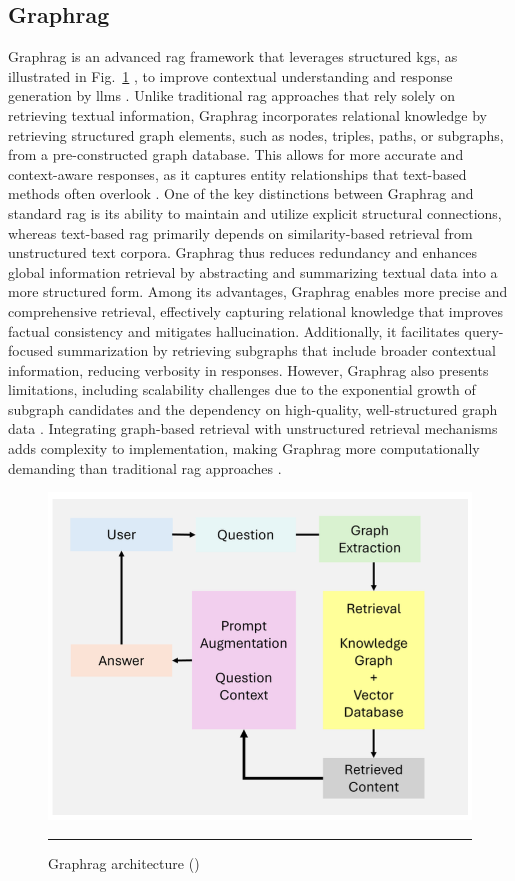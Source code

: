 \subsection*{Graph\gls{rag}}\label{sec:graph-rag}
Graph\gls{rag} is an advanced \gls{rag} framework that leverages structured \glspl{kg}, as illustrated in Fig.~\ref{fig:graph-rag-architecture} , to improve contextual understanding and response generation by \glspl{llm} \cite{peng2024graphragsurvey,singh2025}.
Unlike traditional \gls{rag} approaches that rely solely on retrieving textual information, Graph\gls{rag} incorporates relational knowledge by retrieving structured graph elements, such as nodes, triples, paths, or subgraphs, from a pre-constructed graph database.
This allows for more accurate and context-aware responses, as it captures entity relationships that text-based methods often overlook \cite{singh2025}.
One of the key distinctions between Graph\gls{rag} and standard \gls{rag} is its ability to maintain and utilize explicit structural connections, whereas text-based \gls{rag} primarily depends on similarity-based retrieval from unstructured text corpora.
Graph\gls{rag} thus reduces redundancy and enhances global information retrieval by abstracting and summarizing textual data into a more structured form.
Among its advantages, Graph\gls{rag} enables more precise and comprehensive retrieval, effectively capturing relational knowledge that improves factual consistency and mitigates hallucination.
Additionally, it facilitates query-focused summarization by retrieving subgraphs that include broader contextual information, reducing verbosity in responses.
However, Graph\gls{rag} also presents limitations, including scalability challenges due to the exponential growth of subgraph candidates and the dependency on high-quality, well-structured graph data \cite{singh2025}.
Integrating graph-based retrieval with unstructured retrieval mechanisms adds complexity to implementation, making Graph\gls{rag} more computationally demanding than traditional \gls{rag} approaches \cite{peng2024graphragsurvey,singh2025}.

\begin{figure}[htbp]
    \centering
 \includegraphics[width=.7\textwidth]{figures/literature-review/graphRAG.png}
     \rule{35em}{0.5pt}
    \caption{Graph\gls{rag} architecture (\textcite{singh2025})}
 \label{fig:graph-rag-architecture}
\end{figure}

